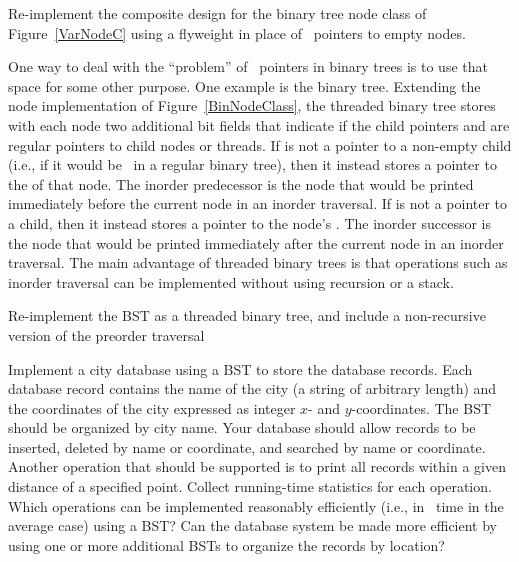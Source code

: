 \begin{projects}

\item
Re-implement the composite design for the binary tree node class of
Figure~\ref{VarNodeC} using a flyweight in place of \NULL\ pointers to
empty nodes.

\item
One way to deal with the ``problem'' of \NULL\ pointers in binary
trees is to use that space for some other purpose.
One example is the
 binary tree.
Extending the node implementation of Figure~\ref{BinNodeClass},
the threaded binary tree stores with each node two additional bit
fields that indicate if the child pointers  and  are
regular pointers to child nodes or threads.
If  is not a pointer to a non-empty child (i.e., if it would
be \NULL\ in a regular binary tree), then it instead stores a pointer
to the  of that node.
The inorder predecessor is the node that would be printed
immediately before the current node in an inorder traversal.
If  is not a pointer to a child,
then it instead stores a pointer to
the node's .
The inorder successor is the node that would be printed immediately
after the current node in an inorder traversal.
The main advantage of threaded binary trees is that operations such as
inorder traversal can be implemented without using
recursion or a stack.

Re-implement the BST as a threaded binary tree,
and include a non-recursive version of the preorder
traversal

\item
\label{CityBSTEx}
Implement a city database using a BST to store the database records.
Each database record contains the name of the city (a string of
arbitrary length) and the coordinates of the city expressed as integer
\(x\)- and \(y\)-coordinates.
The BST should be organized by city name.
Your database should allow records to be inserted, deleted by name or
coordinate, and searched by name or coordinate.
Another operation that should be supported is to print
all records within a given distance of a specified point.
Collect running-time statistics for each operation.
Which operations can be implemented reasonably efficiently (i.e., in
\Thetalogn\ time in the average case) using a BST?
Can the database system be made more efficient by using one or more
additional BSTs to organize the records by location?


\end{projects}
